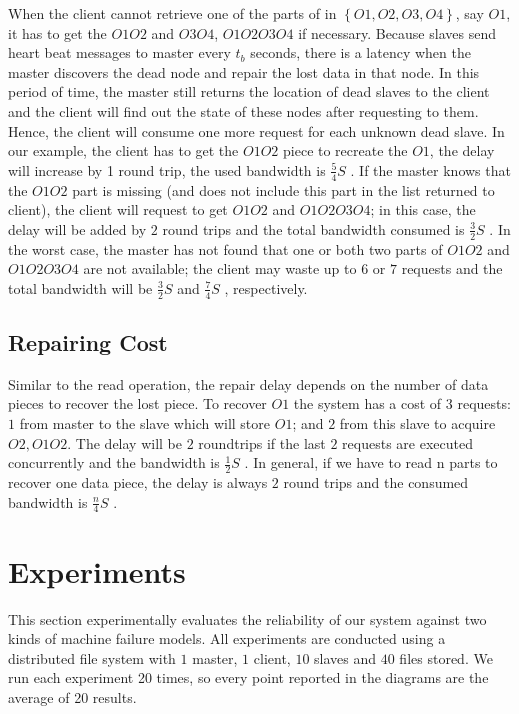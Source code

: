 \documentclass[conference]{IEEEtran}
\begin{document}
When the client cannot retrieve one of the parts of in $\left\{O1, O2, O3, O4\right\}$, say $O1$, it has to get the $O1O2$ and $O3O4$, $O1O2O3O4$ if necessary. Because slaves send heart beat messages to master every $t_b$ seconds, there is a latency when the master discovers the dead node and repair the lost data in that node. In this period of time, the master still returns the location of dead slaves to the client and the client will find out the state of these nodes after requesting to them. Hence, the client will consume one more request for each unknown dead slave. In our example, the client has to get the $O1O2$ piece to recreate the $O1$, the delay will increase by 1 round trip, the used bandwidth is $\frac{5}{4}S$ . If the master knows that the $O1O2$ part is missing (and does not include this part in the list returned to client), the client will request to get $O1O2$ and $O1O2O3O4$; in this case, the delay will be added by $2$ round trips and the total bandwidth consumed is $\frac{3}{2}S$ . In the worst case, the master has not found that one or both two parts of $O1O2$ and $O1O2O3O4$ are not available; the client may waste up to $6$ or $7$ requests and the total bandwidth will be $\frac{3}{2}S$  and $\frac{7}{4}S$ , respectively.


\subsection{Repairing Cost}
Similar to the read operation, the repair delay depends on the number of data pieces to recover the lost piece. To recover $O1$ the system has a cost of $3$ requests: $1$ from master to the slave which will store $O1$; and $2$ from this slave to acquire $O2, O1O2$. The delay will be $2$ roundtrips if the last $2$ requests are executed concurrently and the bandwidth is $\frac{1}{2}S$ . In general, if we have to read n parts to recover one data piece, the delay is always $2$ round trips and the consumed bandwidth is  $\frac{n}{4}S$ .


\section{Experiments}
This section experimentally evaluates the reliability of our system against two kinds of machine failure models. All experiments are conducted using a distributed file system with $1$ master, $1$ client, $10$ slaves and $40$ files stored. We run each experiment 20 times, so every point reported in the diagrams are the average of 20 results.
\end{document}

